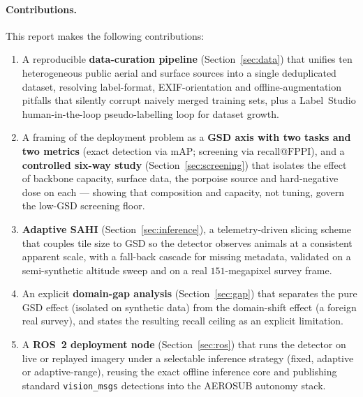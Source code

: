 \documentclass[11pt,a4paper]{article}
\newcommand{\map}{mAP}
\newcommand{\fppi}{\text{FPPI}}
\begin{document}
\paragraph{Contributions.} This report makes the following contributions:
\begin{enumerate}[itemsep=2pt,topsep=2pt]
  \item A reproducible \textbf{data-curation pipeline}
  (Section~\ref{sec:data}) that unifies ten heterogeneous public
  aerial and surface sources into a single deduplicated dataset, resolving
  label-format, EXIF-orientation and offline-augmentation pitfalls that
  silently corrupt naively merged training sets, plus a Label~Studio
  human-in-the-loop pseudo-labelling loop for dataset growth.
  \item A framing of the deployment problem as a \textbf{GSD axis with two
  tasks and two metrics} (exact detection via \map; screening via
  recall@$\fppi$), and a \textbf{controlled six-way study}
  (Section~\ref{sec:screening}) that isolates the effect of backbone capacity,
  surface data, the porpoise source and hard-negative dose on each --- showing
  that composition and capacity, not tuning, govern the low-GSD screening
  floor.
  \item \textbf{Adaptive SAHI} (Section~\ref{sec:inference}), a telemetry-driven
  slicing scheme that couples tile size to GSD so the detector observes animals
  at a consistent apparent scale, with a fall-back cascade for missing
  metadata, validated on a semi-synthetic altitude sweep and on a real
  $151$-megapixel survey frame.
  \item An explicit \textbf{domain-gap analysis} (Section~\ref{sec:gap}) that
  separates the pure GSD effect (isolated on synthetic data) from the
  domain-shift effect (a foreign real survey), and states the resulting recall
  ceiling as an explicit limitation.
  \item A \textbf{ROS~2 deployment node} (Section~\ref{sec:ros}) that runs the
  detector on live or replayed imagery under a selectable inference strategy
  (fixed, adaptive or adaptive-range), reusing the exact offline inference core
  and publishing standard \texttt{vision\_msgs} detections into the AEROSUB
  autonomy stack.
\end{enumerate}
\end{document}
